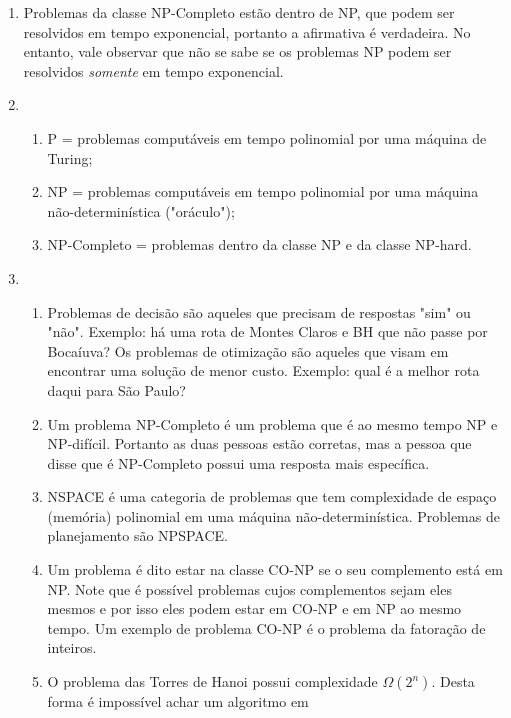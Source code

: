 \documentclass[11pt]{article}
\begin{document}
\begin{enumerate}
    \item Problemas da classe NP-Completo estão dentro de NP, que podem ser
        resolvidos em tempo exponencial, portanto a afirmativa é verdadeira. No
        entanto, vale observar que não se sabe se os problemas NP podem ser
        resolvidos \textit{somente} em tempo exponencial.
    \item
        \begin{enumerate}
            \item P = problemas computáveis em tempo polinomial por uma máquina de Turing;
            \item NP = problemas computáveis em tempo polinomial por uma máquina não-determinística ("oráculo");
            \item NP-Completo = problemas dentro da classe NP e da classe NP-hard.
        \end{enumerate}
    \item
        \begin{enumerate}
            \item Problemas de decisão são aqueles que precisam de respostas
                "sim" ou "não". Exemplo: há uma rota de Montes Claros e BH que
                não passe por Bocaíuva? Os problemas de otimização são aqueles
                que visam em encontrar uma solução de menor custo. Exemplo:
                qual é a melhor rota daqui para São Paulo?
            \item Um problema NP-Completo é um problema que é ao mesmo tempo NP
                e NP-difícil. Portanto as duas pessoas estão corretas, mas a
                pessoa que disse que é NP-Completo possui uma resposta mais
                específica.
            \item NSPACE é uma categoria de problemas que tem complexidade de
                espaço (memória) polinomial em uma máquina não-determinística.
                Problemas de planejamento são NPSPACE.
            \item Um problema é dito estar na classe CO-NP se o seu complemento
                está em NP. Note que é possível problemas cujos complementos
                sejam eles mesmos e por isso eles podem estar em CO-NP e em NP
                ao mesmo tempo. Um exemplo de problema CO-NP é o problema da
                fatoração de inteiros.
            \item O problema das Torres de Hanoi possui complexidade
                $\Omega(2^n)$. Desta forma é impossível achar um algoritmo em

\end{enumerate}
\end{enumerate}
\end{document}
